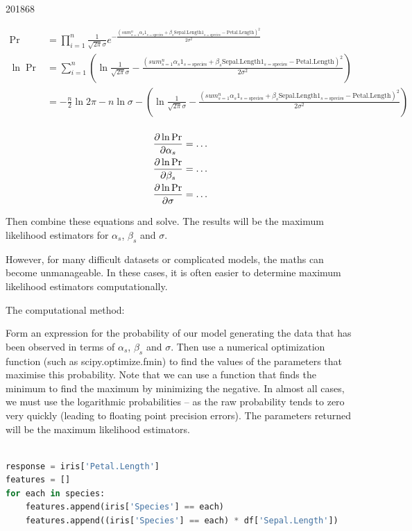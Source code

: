 \documentclass[10pt,\jkfside,a4paper]{article}
\begin{document}
\begin{examquestion}{2018}{6}{8}
\begin{enumerate}[label=(\alph*)]
\[
\begin{split}
\Pr &= \prod^n_{i=1} \frac{1}{\sqrt{2\pi}\sigma} e^{-\frac{
\left(sum^n_{s=1}\alpha_s1_{s=\text{species}} + \beta_s\text{Sepal.Length}
1_{s=\text{species}} - \text{Petal.Length}\right)^2}{2\sigma^2}} \\
\ln \Pr &= \sum^n_{i=1} \left(\ln\frac{1}{\sqrt{2\pi}\sigma} -\frac{
\left(sum^n_{s=1}\alpha_s1_{s=\text{species}} + \beta_s\text{Sepal.Length}
1_{s=\text{species}} - \text{Petal.Length}\right)^2}{2\sigma^2}\right) \\
&= -\frac{n}{2}\ln 2\pi - n\ln \sigma - \left(\ln\frac{1}{\sqrt{2\pi}\sigma} -\frac{
\left(sum^n_{s=1}\alpha_s 1_{s=\text{species}} + \beta_s\text{Sepal.Length}
1_{s=\text{species}} - \text{Petal.Length}\right)^2}{2\sigma^2}\right) \\
\end{split}
\]

\[
\begin{split}
\pdv{\ln \Pr}{\alpha_s} = \dots \\
\pdv{\ln \Pr}{\beta_s} = \dots \\
\pdv{\ln \Pr}{\sigma} = \dots \\
\end{split}
\]

Then combine these equations and solve. The results will be the maximum
likelihood estimators for $\alpha_s$, $\beta_s$ and $\sigma$.

However, for many difficult datasets or complicated models, the maths can
become unmanageable. In these cases, it is often easier to determine maximum
likelihood estimators computationally.

The computational method:

Form an expression for the probability of our model generating the data that
has been observed in terms of $\alpha_s$, $\beta_s$ and $\sigma$. Then use a
numerical optimization function (such as scipy.optimize.fmin) to find the
values of the parameters that maximise this probability. Note that we can
use a function that finds the minimum to find the maximum by minimizing the
negative. In almost all cases, we must use the logarithmic probabilities --
as the raw probability tends to zero very quickly (leading to floating point
precision errors). The parameters returned will be the maximum likelihood
estimators.

\begin{lstlisting}[language=Python]

response = iris['Petal.Length']
features = []
for each in species:
	features.append(iris['Species'] == each)
	features.append((iris['Species'] == each) * df['Sepal.Length'])


\end{lstlisting}
\end{enumerate}
\end{examquestion}
\end{document}
